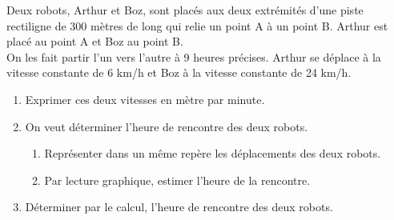 \bigskip


\begin{exercice}[CRPE 2008 G2] %
   Deux robots, Arthur et Boz, sont placés aux deux extrémités d'une piste rectiligne de 300 mètres de long qui relie un point A à un point B. Arthur est placé au point A et Boz au point B. \\
   On les fait partir l'un vers l'autre à 9 heures précises. Arthur se déplace à la vitesse constante de 6 km/h et Boz à la vitesse constante de 24 km/h.
   \begin{enumerate}
      \item Exprimer ces deux vitesses en mètre par minute.
      \item On veut déterminer l'heure de rencontre des deux robots.
      \begin{enumerate}
         \item Représenter dans un même repère les déplacements des deux robots.
         \item Par lecture graphique, estimer l'heure de la rencontre.
      \end{enumerate}
      \item Déterminer par le calcul, l'heure de rencontre des deux robots.
   \end{enumerate}
\end{exercice}

